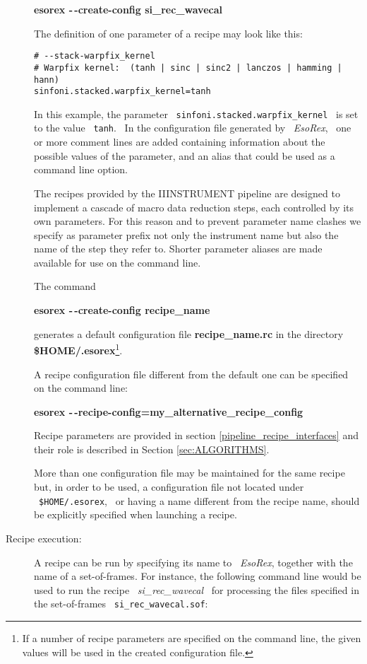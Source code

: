 \begin{description}
{\bf esorex -\,-create-config si\_rec\_wavecal}

The definition of one parameter of a recipe may look like this:
\begin{verbatim}
# --stack-warpfix_kernel
# Warpfix kernel:  (tanh | sinc | sinc2 | lanczos | hamming | hann)
sinfoni.stacked.warpfix_kernel=tanh
\end{verbatim}


In this example, the parameter \ {\tt sinfoni.stacked.warpfix\_kernel} 
\ is set to the value \ {\tt tanh}. \ In the configuration file
generated by \ {\it EsoRex}, \ one or more comment lines are added
containing information about the possible values of the parameter, and
an alias that could be used as a command line option.  

The recipes provided by the IIINSTRUMENT pipeline are designed to implement 
a cascade of macro data reduction steps, each controlled by 
its own parameters.
For this reason and to prevent parameter name clashes we specify as 
parameter prefix not only the instrument name but also the name of the 
step they refer to. Shorter parameter aliases are made available for 
use on the command line.

The command

{\bf esorex -\,-create-config recipe\_name}

generates a default configuration file {\bf recipe\_name.rc} in the directory 
{\bf \${HOME}/.esorex}\footnote{If a number of recipe parameters are 
specified on the command line, the given values will be used in the
created configuration file.}.

A recipe configuration file different from the default one can be 
specified on the command line:

{\bf esorex -\,-recipe-config=my\_alternative\_recipe\_config}


Recipe parameters are provided in section \ref{pipeline_recipe_interfaces} 
and their role is described in Section \ref{sec:ALGORITHMS}.

More than one configuration file may be maintained for the same recipe
but, in order to be used, a configuration file not located under 
\ {\tt \$HOME/.esorex}, \ or having a name different from the recipe 
name, should be explicitly specified when launching a recipe.


\item [Recipe execution:]


A recipe can be run by specifying its name to 
\ {\it EsoRex}, together with the name of a set-of-frames.
For instance, the
following command line would be used to run the recipe \ {\it si\_rec\_wavecal}
\ for processing the files specified in the set-of-frames 
\ {\tt si\_rec\_wavecal.sof}:


\end{description}
